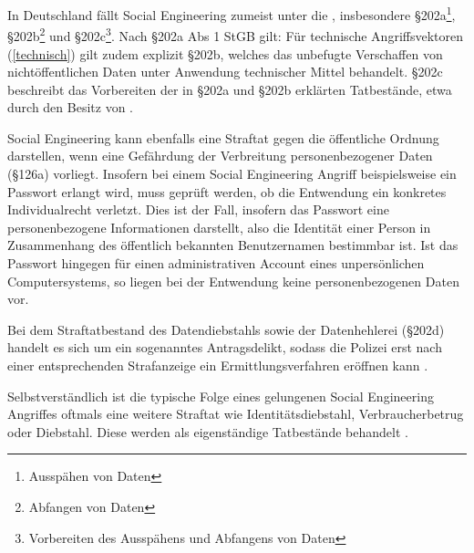 In Deutschland fällt Social Engineering zumeist unter die , insbesondere §202a\footnote{Ausspähen von Daten}, §202b\footnote{Abfangen von Daten} und §202c\footnote{Vorbereiten des Ausspähens und Abfangens von Daten}.
Nach §202a Abs 1 StGB gilt:
Für technische Angriffsvektoren (\autoref{technisch}) gilt zudem explizit §202b, welches das unbefugte Verschaffen von nichtöffentlichen Daten unter Anwendung technischer Mittel behandelt.
§202c beschreibt das Vorbereiten der in §202a und §202b erklärten Tatbestände, etwa durch den Besitz von . 


Social Engineering kann ebenfalls eine Straftat gegen die öffentliche Ordnung darstellen, wenn eine Gefährdung der Verbreitung personenbezogener Daten (§126a) vorliegt.
Insofern bei einem Social Engineering Angriff beispielsweise ein Passwort erlangt wird, muss geprüft werden, ob die Entwendung ein konkretes Individualrecht verletzt.
Dies ist der Fall, insofern das Passwort eine personenbezogene Informationen darstellt, also die Identität einer Person in Zusammenhang des öffentlich bekannten Benutzernamen bestimmbar ist.
Ist das Passwort hingegen für einen administrativen Account eines unpersönlichen Computersystems, so liegen bei der Entwendung keine personenbezogenen Daten vor.

Bei dem Straftatbestand des Datendiebstahls sowie der Datenhehlerei (§202d) handelt es sich um ein sogenanntes Antragsdelikt, sodass die Polizei erst nach einer entsprechenden Strafanzeige ein Ermittlungsverfahren eröffnen kann .


Selbstverständlich ist die typische Folge eines gelungenen Social Engineering Angriffes oftmals eine weitere Straftat wie Identitätsdiebstahl, Verbraucherbetrug oder Diebstahl.
Diese werden als eigenständige Tatbestände behandelt .
